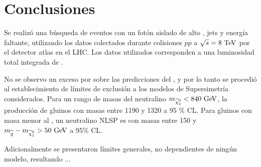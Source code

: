 \chapter{Conclusiones}\label{cap:conclusiones}


Se realizó una búsqueda de eventos con un fotón aislado de alto {\pt}, jets y
energía faltante, utilizando los datos colectados durante colisiones $pp$ a
$\sqrt{s}=8 \tev$ por el detector atlas en el LHC. Los datos utilizados
corresponden a una luminosidad total integrada de {\ilumi}.

No se observo un exceso por sobre las predicciones del {\SM}, y por lo tanto se
procedió al establecimiento de límites de exclusión a los modelos de
Supersimetría considerados. Para un rango de masas del neutralino $m_{\ninoone}
< 840 \gev$, la producción de gluinos con masas entre 1190 y 1320 \gev a 95 \%
CL. Para gluinos con masa menor al \tev, un neutralino NLSP es con masas entre
150 {\gev} y $m_{\gluino}-m_{\ninoone} > 50 \gev$ a 95\% CL.

Adicionalmente se presentaron límites generales, no dependientes de ningún
modelo, resultando ...
